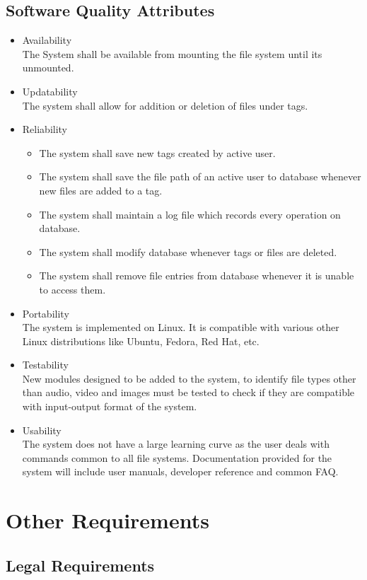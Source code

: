 \subsection {Software Quality Attributes}
\begin{itemize}
\item Availability \\
The System shall be available from mounting the file system until its unmounted.
\item Updatability \\
The system shall allow for addition or deletion of files under tags.
\item Reliability
\begin{itemize}
\item The system shall save new tags created by active user.
\item The system shall save the file path of an active user to database whenever new files are added to a tag.
\item The system shall maintain a log file which records every operation on database.
\item The system shall modify database whenever tags or files are deleted.
\item The system shall remove file entries from database whenever it is unable to access them.
\end{itemize}
\item Portability \\
The system is implemented on Linux. It is compatible with various other Linux distributions like Ubuntu, Fedora, Red Hat, etc.
\item Testability \\
New modules designed to be added to the system, to identify file types other than audio, video and images must be tested to check if they are compatible with input-output format of the system.
\item Usability \\
The system does not have a large learning curve as the user deals with commands common to all file systems. Documentation provided for the system will include user manuals, developer reference and common FAQ.
\end{itemize}

\section{Other Requirements}
\subsection{Legal Requirements}

